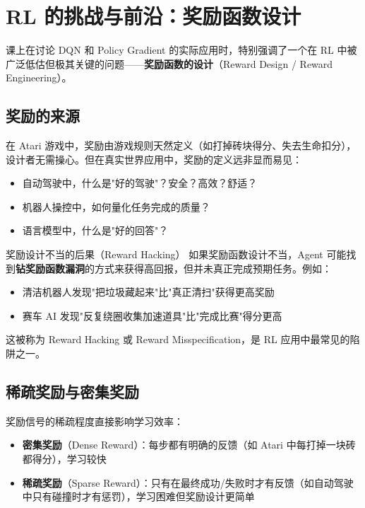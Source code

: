 \section{RL 的挑战与前沿：奖励函数设计}

课上在讨论 DQN 和 Policy Gradient 的实际应用时，特别强调了一个在 RL 中被广泛低估但极其关键的问题------\textbf{奖励函数的设计}（Reward Design / Reward Engineering）。

\subsection{奖励的来源}

在 Atari 游戏中，奖励由游戏规则天然定义（如打掉砖块得分、失去生命扣分），设计者无需操心。但在真实世界应用中，奖励的定义远非显而易见：

\begin{itemize}
    \item 自动驾驶中，什么是"好的驾驶"？安全？高效？舒适？
    \item 机器人操控中，如何量化任务完成的质量？
    \item 语言模型中，什么是"好的回答"？
\end{itemize}

\begin{warningbox}{奖励设计不当的后果（Reward Hacking）}
如果奖励函数设计不当，Agent 可能找到\textbf{钻奖励函数漏洞}的方式来获得高回报，但并未真正完成预期任务。例如：
\begin{itemize}
    \item 清洁机器人发现"把垃圾藏起来"比"真正清扫"获得更高奖励
    \item 赛车 AI 发现"反复绕圈收集加速道具"比"完成比赛"得分更高
\end{itemize}
这被称为 Reward Hacking 或 Reward Misspecification，是 RL 应用中最常见的陷阱之一。
\end{warningbox}

\subsection{稀疏奖励与密集奖励}

奖励信号的稀疏程度直接影响学习效率：

\begin{itemize}
    \item \textbf{密集奖励}（Dense Reward）：每步都有明确的反馈（如 Atari 中每打掉一块砖都得分），学习较快
    \item \textbf{稀疏奖励}（Sparse Reward）：只有在最终成功/失败时才有反馈（如自动驾驶中只有碰撞时才有惩罚），学习困难但奖励设计更简单
\end{itemize}

